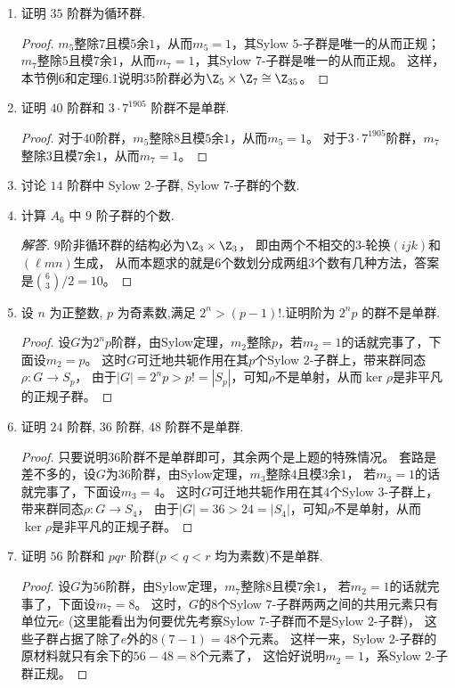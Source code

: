 \begin{enumerate}
\item 证明 $35$ 阶群为循环群.
\begin{proof}
    $m_5$整除$7$且模$5$余$1$，从而$m_5=1$，其Sylow $5$-子群是唯一的从而正规；
    $m_7$整除$5$且模$7$余$1$，从而$m_7=1$，其Sylow $7$-子群是唯一的从而正规。
    这样，本节例6和定理6.1说明$35$阶群必为$\Z_5\times\Z_7\cong\Z_{35}$。
\end{proof}
\item 证明 $40$ 阶群和 $3 \cdot 7^{1905}$ 阶群不是单群.
\begin{proof}
    对于$40$阶群，$m_5$整除$8$且模$5$余$1$，从而$m_5=1$。
    对于$3\cdot7^{1905}$阶群，$m_7$整除$3$且模$7$余$1$，从而$m_7=1$。
\end{proof}
\item 讨论 $14$ 阶群中 Sylow $2$-子群, Sylow $7$-子群的个数.
\item 计算 $A_6$ 中 $9$ 阶子群的个数.
\begin{proof}[解答]
    $9$阶非循环群的结构必为$\Z_3\times\Z_3$，
    即由两个不相交的$3$-轮换$(ijk)$和$(\ell mn)$生成，
    从而本题求的就是$6$个数划分成两组$3$个数有几种方法，答案是$\binom{6}{3}/2=10$。
\end{proof}
\item 设 $n$ 为正整数, $p$ 为奇素数,满足 $2^n > (p-1)!$.证明阶为 $2^n p$ 的群不是单群.
\begin{proof}
    设$G$为$2^np$阶群，由Sylow定理，$m_2$整除$p$，若$m_2=1$的话就完事了，下面设$m_2=p$。
    这时$G$可迁地共轭作用在其$p$个Sylow $2$-子群上，带来群同态$\rho:G \to S_p$，
    由于$|G|=2^np>p!=|S_p|$，可知$\rho$不是单射，从而$\ker\rho$是非平凡的正规子群。
\end{proof}
\item 证明 $24$ 阶群, $36$ 阶群, $48$ 阶群不是单群.
\begin{proof}
    只要说明$36$阶群不是单群即可，其余两个是上题的特殊情况。
    套路是差不多的，设$G$为$36$阶群，由Sylow定理，$m_3$整除$4$且模$3$余$1$，
    若$m_3=1$的话就完事了，下面设$m_3=4$。
    这时$G$可迁地共轭作用在其$4$个Sylow $3$-子群上，带来群同态$\rho:G \to S_4$，
    由于$|G|=36>24=|S_4|$，可知$\rho$不是单射，从而$\ker\rho$是非平凡的正规子群。
\end{proof}
\item 证明 $56$ 阶群和 $pqr$ 阶群($p<q<r$ 均为素数)不是单群.
\begin{proof}
    设$G$为$56$阶群，由Sylow定理，$m_7$整除$8$且模$7$余$1$，
    若$m_2=1$的话就完事了，下面设$m_7=8$。
    这时，$G$的$8$个Sylow $7$-子群两两之间的共用元素只有单位元$e$ 
    (这里能看出为何要优先考察Sylow $7$-子群而不是Sylow $2$-子群)，
    这些子群占据了除了$e$外的$8(7-1)=48$个元素。
    这样一来，Sylow $2$-子群的原材料就只有余下的$56-48=8$个元素了，
    这恰好说明$m_2=1$，系Sylow $2$-子群正规。


\end{proof}
\end{enumerate}
